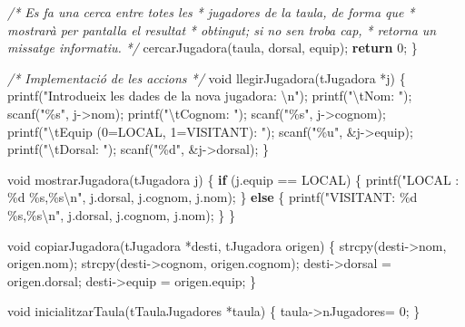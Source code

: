\documentclass[
]{book}
\newenvironment{Shaded}{\begin{snugshade}}{\end{snugshade}}
\newcommand{\CommentTok}[1]{\textcolor[rgb]{0.56,0.35,0.01}{\textit{#1}}}
\newcommand{\ControlFlowTok}[1]{\textcolor[rgb]{0.13,0.29,0.53}{\textbf{#1}}}
\newcommand{\DataTypeTok}[1]{\textcolor[rgb]{0.13,0.29,0.53}{#1}}
\newcommand{\DecValTok}[1]{\textcolor[rgb]{0.00,0.00,0.81}{#1}}
\newcommand{\NormalTok}[1]{#1}
\newcommand{\SpecialCharTok}[1]{\textcolor[rgb]{0.00,0.00,0.00}{#1}}
\newcommand{\StringTok}[1]{\textcolor[rgb]{0.31,0.60,0.02}{#1}}
\begin{document}
\begin{Shaded}
\begin{Highlighting}[]
    \CommentTok{/* Es fa una cerca entre totes les}
\CommentTok{     * jugadores de la taula, de forma que}
\CommentTok{     * mostrarà per pantalla el resultat}
\CommentTok{     * obtingut; si no se\textquotesingle{}n troba cap,}
\CommentTok{     * retorna un missatge informatiu.}
\CommentTok{     */}
\NormalTok{    cercarJugadora(taula, dorsal, equip);}
    \ControlFlowTok{return} \DecValTok{0}\NormalTok{;}
\NormalTok{\}}

\CommentTok{/* Implementació de les accions */}
\DataTypeTok{void}\NormalTok{ llegirJugadora(tJugadora *j) \{}
\NormalTok{    printf(}\StringTok{"Introdueix les dades de la nova jugadora: }\SpecialCharTok{\textbackslash{}n}\StringTok{"}\NormalTok{);}
\NormalTok{    printf(}\StringTok{"}\SpecialCharTok{\textbackslash{}t}\StringTok{Nom: "}\NormalTok{);}
\NormalTok{    scanf(}\StringTok{"\%s"}\NormalTok{, j{-}\textgreater{}nom);}
\NormalTok{    printf(}\StringTok{"}\SpecialCharTok{\textbackslash{}t}\StringTok{Cognom: "}\NormalTok{);}
\NormalTok{    scanf(}\StringTok{"\%s"}\NormalTok{, j{-}\textgreater{}cognom);}
\NormalTok{    printf(}\StringTok{"}\SpecialCharTok{\textbackslash{}t}\StringTok{Equip (0=LOCAL, 1=VISITANT): "}\NormalTok{);}
\NormalTok{    scanf(}\StringTok{"\%u"}\NormalTok{, \&j{-}\textgreater{}equip);}
\NormalTok{    printf(}\StringTok{"}\SpecialCharTok{\textbackslash{}t}\StringTok{Dorsal: "}\NormalTok{);}
\NormalTok{    scanf(}\StringTok{"\%d"}\NormalTok{, \&j{-}\textgreater{}dorsal);}
\NormalTok{\}}

\DataTypeTok{void}\NormalTok{ mostrarJugadora(tJugadora j) \{}
    \ControlFlowTok{if}\NormalTok{ (j.equip == LOCAL) \{}
\NormalTok{        printf(}\StringTok{"LOCAL   : \%d \%s,\%s}\SpecialCharTok{\textbackslash{}n}\StringTok{"}\NormalTok{, j.dorsal, j.cognom, j.nom);}
\NormalTok{    \} }\ControlFlowTok{else}\NormalTok{ \{}
\NormalTok{        printf(}\StringTok{"VISITANT: \%d \%s,\%s}\SpecialCharTok{\textbackslash{}n}\StringTok{"}\NormalTok{, j.dorsal, j.cognom, j.nom);}
\NormalTok{    \}}
\NormalTok{\}}

\DataTypeTok{void}\NormalTok{ copiarJugadora(tJugadora *desti, tJugadora origen) \{}
\NormalTok{    strcpy(desti{-}\textgreater{}nom, origen.nom);}
\NormalTok{    strcpy(desti{-}\textgreater{}cognom, origen.cognom);}
\NormalTok{    desti{-}\textgreater{}dorsal = origen.dorsal;}
\NormalTok{    desti{-}\textgreater{}equip = origen.equip;}
\NormalTok{\}}

\DataTypeTok{void}\NormalTok{ inicialitzarTaula(tTaulaJugadores *taula) \{    }
\NormalTok{    taula{-}\textgreater{}nJugadores= }\DecValTok{0}\NormalTok{;}
\NormalTok{\}}


\end{Highlighting}
\end{Shaded}
\end{document}
